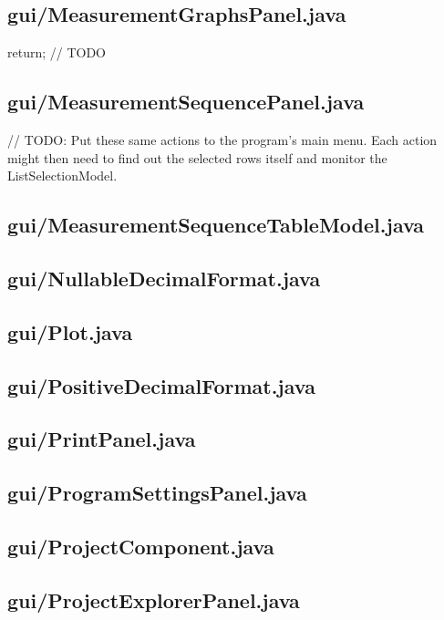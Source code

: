 \subsection{gui/MeasurementGraphsPanel.java}
        return; // TODO

\subsection{gui/MeasurementSequencePanel.java}
        // TODO: Put these same actions to the program's main menu. Each action might then need to find out the selected rows itself and monitor the ListSelectionModel.

\subsection{gui/MeasurementSequenceTableModel.java}

\subsection{gui/NullableDecimalFormat.java}

\subsection{gui/Plot.java}

\subsection{gui/PositiveDecimalFormat.java}

\subsection{gui/PrintPanel.java}

\subsection{gui/ProgramSettingsPanel.java}

\subsection{gui/ProjectComponent.java}


\subsection{gui/ProjectExplorerPanel.java}


